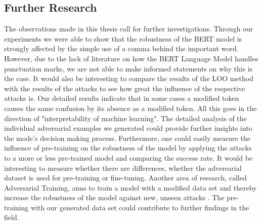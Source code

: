 \subsection{Further Research}
The observations made in this thesis call for further investigations. 
Through our experiments we were able to show that the robustness of the BERT model is strongly affected by the simple use of a comma behind the important word. However, due to the lack of literature on how the BERT Language Model handles punctuation marks, we are not able to make informed statements on why this is the case. It would also be interesting to compare the results of the LOO method with the results of the attacks to see how great the influence of the respective attacks is. Our detailed results indicate that in some cases a modified token causes the same confusion by its absence as a modified token. All this goes in the direction of "interpretability of machine learning". The detailed analysis of the individual adversarial examples we generated could provide further insights into the mode's decision making process.
Furthermore, one could easily measure the influence of pre-training on the robustness of the model by applying the attacks to a more or less pre-trained model and comparing the success rate. It would be interesting to measure whether there are differences, whether the adversarial dataset is used for pre-training or fine-tuning. Another area of research, called Adversarial Training, aims to train a model with a modified data set and thereby increase the robustness of the model against new, unseen attacks \cite{tramer2017ensemble}. The pre-training with our generated data set could contribute to further findings in the field. 







\FloatBarrier


